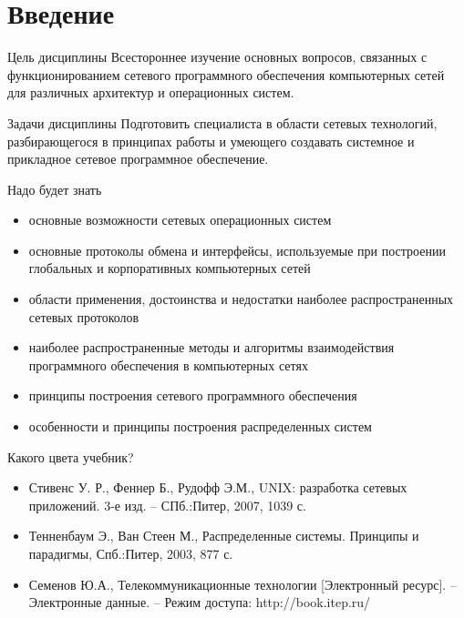 
\subtitle{Введение}



%
%
\section{Введение}

\begin{frame}{Цель дисциплины}
	Всестороннее изучение основных вопросов, связанных с функционированием сетевого программного обеспечения компьютерных сетей для различных архитектур и операционных систем.
\end{frame}

\begin{frame}{Задачи дисциплины}
	Подготовить специалиста в области сетевых технологий,  разбирающегося в принципах работы и умеющего создавать системное и прикладное сетевое программное обеспечение.
\end{frame}

\begin{frame}{Надо будет знать}
	\begin{itemize}
		\item основные возможности сетевых операционных систем
		\item основные протоколы обмена и интерфейсы, используемые при построении глобальных и корпоративных компьютерных сетей
		\item области применения,  достоинства и недостатки наиболее распространенных сетевых протоколов
		\item наиболее распространенные методы и алгоритмы взаимодействия программного обеспечения в компьютерных сетях
		\item принципы построения сетевого программного обеспечения
		\item особенности и принципы построения распределенных систем
	\end{itemize}
\end{frame}

\begin{frame}{Какого цвета учебник?}
	\begin{itemize}
		\item Стивенс У. Р.,  Феннер Б.,  Рудофф Э.М.,  UNIX: разработка сетевых приложений. 3-е изд. – СПб.:Питер,  2007,  1039 с.
		\item Тенненбаум Э.,  Ван Стеен М.,  Распределенные системы. Принципы и парадигмы,  Спб.:Питер,  2003,  877 с.
		\item Семенов Ю.А.,  Телекоммуникационные технологии [Электронный ресурс]. – Электронные данные. – Режим доступа: http://book.itep.ru/
	\end{itemize}
\end{frame}

